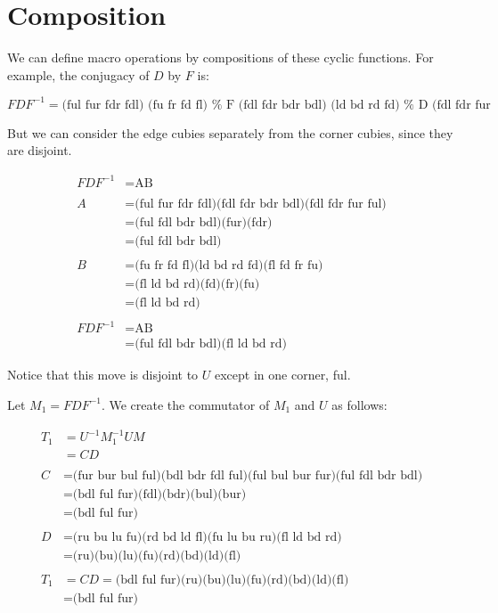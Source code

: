 \section{Composition}

We can define macro operations by compositions of these cyclic
functions.  For example, the conjugacy of $D$ by $F$ is:

\begin{displaymath}
    FDF^{-1}
  = \text{(ful fur fdr fdl) (fu fr fd fl)     %
          (fdl fdr bdr bdl) (ld bd rd fd)     %
          (fdl fdr fur ful) (fl fd fr fu)}    %
\end{displaymath}

But we can consider the edge cubies separately from the corner cubies,
since they are disjoint.

\begin{align*}
  FDF^{-1} &= \text{AB} \\
  &       \\
  A
  &= \text{(ful fur fdr fdl)(fdl fdr bdr bdl)(fdl fdr fur ful)} \\
  &= \text{(ful fdl bdr bdl)(fur)(fdr)} \\
  &= \text{(ful fdl bdr bdl)} \\
  & \\
  B
  &= \text{(fu fr fd fl)(ld bd rd fd)(fl fd fr fu)} \\
  &= \text{(fl ld bd rd)(fd)(fr)(fu)} \\
  &= \text{(fl ld bd rd)} \\
  & \\
  FDF^{-1}
  &= \text{AB} \\
  &= \text{(ful fdl bdr bdl)(fl ld bd rd)}
\end{align*}

Notice that this move is disjoint to $U$ except in one corner, ful.

Let $M_1 = FDF^{-1}$.  We create the commutator of $M_1$ and $U$ as
follows:

\begin{align*}
  T_1
  &= U^{-1}M_1^{-1}UM \\
  &= CD \\
  & \\
  C
  &= \text{(fur bur bul ful)(bdl bdr fdl ful)(ful bul bur fur)(ful fdl bdr bdl)} \\
  &= \text{(bdl ful fur)(fdl)(bdr)(bul)(bur)} \\
  &= \text{(bdl ful fur)} \\
  & \\
  D
  &= \text{(ru bu lu fu)(rd bd ld fl)(fu lu bu ru)(fl ld bd rd)} \\
  &= \text{(ru)(bu)(lu)(fu)(rd)(bd)(ld)(fl)} \\
  & \\
  T_1
  &= CD = \text{(bdl ful fur)(ru)(bu)(lu)(fu)(rd)(bd)(ld)(fl)} \\
  &= \text{(bdl ful fur)} \\
\end{align*}
  



